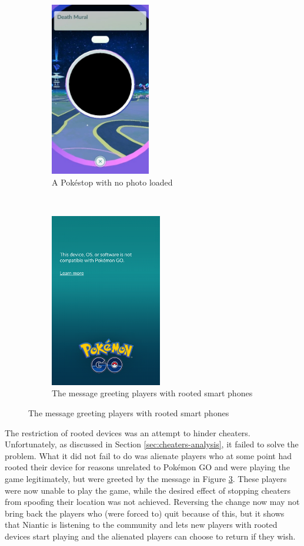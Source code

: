 \begin{figure}[h]
	\centering
	\begin{subfigure}[t]{0.45\textwidth}
		\centering
		\includegraphics[height=3in]{Figures/pokestop-no-photo}
		\caption{A Pokéstop with no photo loaded}
		\label{fig:blank-pokestop}
	\end{subfigure}
	~
	\begin{subfigure}[t]{0.45\textwidth}
		\centering
		\includegraphics[height=3in]{Figures/pogo-no-root}
		\caption{The message greeting players with rooted smart phones}
		\label{fig:no-root}
	\end{subfigure}
\end{figure}

The restriction of rooted devices was an attempt to hinder cheaters. Unfortunately, as discussed in Section \ref{sec:cheaters-analysis}, it failed to solve the problem. What it did not fail to do was alienate players who at some point had rooted their device for reasons unrelated to Pokémon GO and were playing the game legitimately, but were greeted by the message in Figure \ref{fig:no-root}. These players were now unable to play the game, while the desired effect of stopping cheaters from spoofing their location was not achieved. Reversing the change now may not bring back the players who (were forced to) quit because of this, but it shows that Niantic is listening to the community and lets new players with rooted devices start playing and the alienated players can choose to return if they wish.

